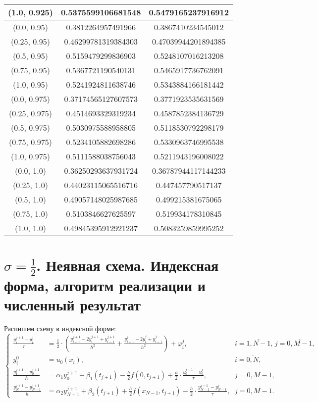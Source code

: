 \begin{table}[H]
\begin{tabular}{|c|c|c|}
\hline
(1.0, 0.925) & 0.5375599106681548 & 0.5479165237916912 \\
\hline
\hline
(0.0, 0.95) & 0.3812264957491966 & 0.3867410234545012 \\
\hline
(0.25, 0.95) & 0.46299781319384303 & 0.47039944201894385 \\
\hline
(0.5, 0.95) & 0.5159479299836903 & 0.5248107016213208 \\
\hline
(0.75, 0.95) & 0.5367721190540131 & 0.5465917736762091 \\
\hline
(1.0, 0.95) & 0.5241924811638746 & 0.5343884166181442 \\
\hline
\hline
(0.0, 0.975) & 0.37174565127607573 & 0.3771923535631569 \\
\hline
(0.25, 0.975) & 0.4514693329319234 & 0.4587852384136729 \\
\hline
(0.5, 0.975) & 0.5030975588958805 & 0.5118530792298179 \\
\hline
(0.75, 0.975) & 0.5234105882698286 & 0.5330963746995538 \\
\hline
(1.0, 0.975) & 0.5111588038756043 & 0.5211943196008022 \\
\hline
\hline
(0.0, 1.0) & 0.36250293637931724 & 0.36787944117144233 \\
\hline
(0.25, 1.0) & 0.44023115065516716 & 0.447457790517137 \\
\hline
(0.5, 1.0) & 0.49057148025987685 & 0.499215381675065 \\
\hline
(0.75, 1.0) & 0.5103846627625597 & 0.519934178310845 \\
\hline
(1.0, 1.0) & 0.49845395912921237 & 0.5083259859995252 \\
\hline
\end{tabular}
\end{table}
\normalsize

\section{$\sigma=\frac{1}{2}$. Неявная схема. Индексная форма, алгоритм реализации и численный результат}
Распишем схему в индексной форме:
\begin{equation}
\left\{
\begin{array}{lll}
\frac{y_{i}^{j+1}-y_{i}^{j}}{\tau} & =\frac{1}{2}\cdot(\frac{y_{i+1}^{j+1}-2y_{i}^{j+1}+y_{i-1}^{j+1}}{h^{2}}+\frac{y_{i+1}^{j}-2y_{i}^{j}+y_{i-1}^{j}}{h^{2}}) + \varphi_{i}^{j}\text{,} & i=\overline{1,N-1}\text{, } j=\overline{0,M-1}\text{,}\\
y_{i}^{0} & = u_{0}(x_{i})\text{,} & i=\overline{0,N}\text{,} \\
\frac{y_{1}^{j+1}-y_{0}^{j+1}}{h} & = \alpha_{1}y_{0}^{j+1} + \beta_{1}(t_{j+1}) - \frac{h}{2}f(0,t_{j+1}) + \frac{h}{2}\cdot\frac{y_{0}^{j+1}-y_{0}^{j}}{\tau}\text{,} & j=\overline{0,M-1}\text{,}\\
\frac{y_{N}^{j+1}-y_{N-1}^{j+1}}{h} & = \alpha_{2}y_{N-1}^{j+1} + \beta_{2}(t_{j+1}) + \frac{h}{2}f(x_{N-1},t_{j+1}) - \frac{h}{2}\cdot\frac{y_{N-1}^{j+1}-y_{N-1}^{j}}{\tau}\text{,} & j=\overline{0,M-1}\text{.}
\end{array}
\right.
\end{equation} \par

